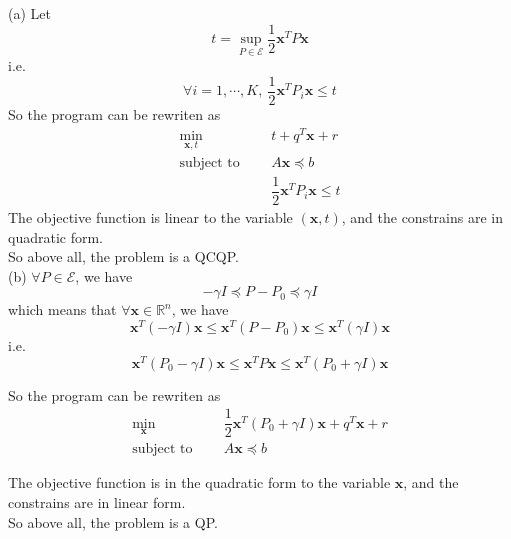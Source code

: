(a) Let $$t=\sup\limits_{P\in\mathcal{E}}\dfrac{1}{2}\mathbf{x}^TP\mathbf{x}$$
i.e. $$\forall i=1,\cdots,K,\ \dfrac{1}{2}\mathbf{x}^TP_i\mathbf{x}\leq t$$
So the program can be rewriten as
\begin{align*}
    \min_{\mathbf{x},t}\ \ \ \ \ & t+q^T \mathbf{x}+r \\
    \text {subject to }\ \ \ \ \ & A \mathbf{x} \preceq b\\
    & \dfrac{1}{2}\mathbf{x}^TP_i\mathbf{x}\leq t
\end{align*}
The objective function is linear to the variable $(\mathbf{x},t)$, and the constrains are in quadratic form.\\
So above all, the problem is a QCQP.\\

(b) $\forall P\in\mathcal{E}$, we have
$$-\gamma I \preceq P-P_0 \preceq \gamma I$$
which means that $\forall\mathbf{x}\in\mathbb{R}^n$, we have
$$\mathbf{x}^T (-\gamma I) \mathbf{x}\leq \mathbf{x}^T(P-P_0)\mathbf{x} \leq  \mathbf{x}^T(\gamma I)\mathbf{x}$$
i.e.
$$\mathbf{x}^T (P_0-\gamma I) \mathbf{x}\leq \mathbf{x}^TP\mathbf{x} \leq \mathbf{x}^T(P_0+\gamma I)\mathbf{x}$$

So the program can be rewriten as
\begin{align*}
    \min_{\mathbf{x}}\ \ \ \ \ & \dfrac{1}{2}\mathbf{x}^T(P_0+\gamma I)\mathbf{x}+q^T \mathbf{x}+r \\
    \text {subject to }\ \ \ \ \ & A \mathbf{x} \preceq b
\end{align*}

The objective function is in the quadratic form to the variable $\mathbf{x}$, and the constrains are in linear form.\\

So above all, the problem is a QP.\\

